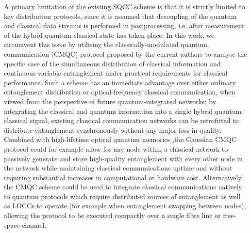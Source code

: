\documentclass[%
 reprint,
 superscriptaddress,
 amsmath,
 amssymb,
 aps,
 pra,
]{revtex4-2}
\begin{document}
A primary limitation of the existing SQCC scheme is that it is strictly limited to key distribution protocols, since it is assumed that decoupling of the quantum and classical data streams is performed in postprocessing, i.e. after measurement of the hybrid quantum-classical state has taken place. In this work, we circumvent this issue by utilising the classically-modulated quantum communication (CMQC) protocol proposed by the current authors \cite{zaunders_generalised_2026} to analyse the specific case of the simultaneous distribution of classical information and continuous-variable entanglement under practical requirements for classical performance. Such a scheme has an immediate advantage over either ordinary entanglement distribution or optical-frequency classical communication, when viewed from the perspective of future quantum-integrated networks; by integrating the classical and quantum information into a single hybrid quantum-classical signal, existing classical communication networks can be retrofitted to distribute entanglement synchronously without any major loss in quality. Combined with high-lifetime optical quantum memories \cite{nguyen_quantum_2019,liu_heralded_2021,ortu_storage_2022},the Gaussian CMQC protocol could for example allow for any node within a classical network to passively generate and store high-quality entanglement with every other node in the network while maintaining classical communications uptime and without requiring substantial increases in computational or hardware cost. Alternatively, the CMQC scheme could be used to integrate classical communications natively to quantum protocols which require distributed sources of entanglement as well as LOCCs to operate (for example when entanglement swapping between nodes), allowing the protocol to be executed compactly over a single fibre line or free-space channel.
\end{document}
